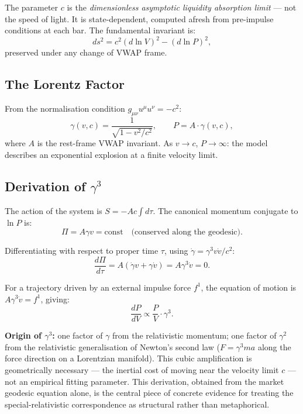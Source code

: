 \documentclass[12pt,a4paper]{article}
\begin{document}
The parameter $c$ is the \emph{dimensionless asymptotic liquidity
absorption limit} --- not the speed of light. It is state-dependent,
computed afresh from pre-impulse conditions at each bar. The fundamental
invariant is:
\begin{equation}
    \boxed{ds^2 = c^2(d\ln V)^2 - (d\ln P)^2},
\end{equation}
preserved under any change of VWAP frame.

\subsection{The Lorentz Factor}

From the normalisation condition $g_{\mu\nu}u^\mu u^\nu = -c^2$:
\begin{equation}
    \boxed{\gamma(v,c) = \frac{1}{\sqrt{1 - v^2/c^2}}}, \qquad
    P = A \cdot \gamma(v, c),
\end{equation}
where $A$ is the rest-frame VWAP invariant. As $v \to c$, $P \to \infty$:
the model describes an exponential explosion at a finite velocity limit.

\subsection{Derivation of \texorpdfstring{$\gamma^3$}{gamma-cubed}}

The action of the system is $S = -Ac\int d\tau$. The canonical momentum
conjugate to $\ln P$ is:
\begin{equation}
    \Pi = A\gamma v = \text{const} \quad \text{(conserved along the geodesic)}.
\end{equation}

Differentiating with respect to proper time $\tau$, using
$\dot\gamma = \gamma^3 v\dot v/c^2$:
\begin{equation}
    \frac{d\Pi}{d\tau} = A\!\left(\dot\gamma v + \gamma\dot v\right)
    = A\gamma^3\dot v = 0.
\end{equation}

For a trajectory driven by an external impulse force $f^1$, the equation
of motion is $A\gamma^3\dot v = f^1$, giving:
\begin{equation}
    \boxed{\frac{dP}{dV} \propto \frac{P}{V}\cdot\gamma^3.}
\end{equation}

\textbf{Origin of $\gamma^3$:} one factor of $\gamma$ from the relativistic
momentum; one factor of $\gamma^2$ from the relativistic generalisation of
Newton's second law ($F = \gamma^3 ma$ along the force direction on a
Lorentzian manifold). This cubic amplification is geometrically
necessary --- the inertial cost of moving near the velocity limit $c$ ---
not an empirical fitting parameter. This derivation, obtained from the
market geodesic equation alone, is the central piece of concrete evidence
for treating the special-relativistic correspondence as structural rather
than metaphorical.
\end{document}
